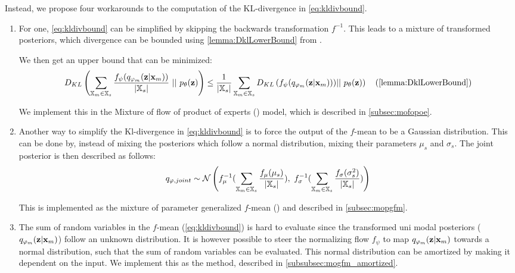 Instead, we propose four workarounds to the computation of the KL-divergence in \cref{eq:kldivbound}.
\begin{enumerate}

    \item For one, \cref{eq:kldivbound} can be simplified by skipping the backwards transformation $f^{-1}$.
    This leads to a mixture of transformed posteriors, which divergence can be bounded using \cref{lemma:DklLowerBound} from \parencite{sutter_multimodal_2020}.

    We then get an upper bound that can be minimized:
    \begin{equation}
        D_{KL}\left(\sum _{\xsetm \in \xsubset} \frac{f_{\psi}(\unimodalpost)}{|\xsubset|}\ ||\ \prior\right) \leq \frac{1}{|\xsubset|} \sum  _{\xsetm \in \xsubset} D_{KL} \left(f_{\psi} (\unimodalpost))||\ \prior \right) \quad (\cref{lemma:DklLowerBound})
    \end{equation}

    We implement this in the Mixture of flow of product of experts () model, which is described in \cref{subsec:mofopoe}.


    \item Another way to simplify the Kl-divergence in \cref{eq:kldivbound} is to force the output of the $f$-mean to be a Gaussian distribution.
    This can be done by, instead of mixing the posteriors which follow a normal distribution, mixing their parameters $\mu_s$ and $\sigma_s$.
    The joint posterior is then described as follows:
    \begin{equation}
        \label{eq:qjointmopgfm}
        q_{\phi, joint} \sim \mathcal{N}\left(  f_{\mu}^{-1}(\sum _{\xsetm \in \xsubset} \frac{f_{\mu}(\mu_s)}{|\xsubset|}),\ f_{\sigma}^{-1}(\sum  _{\xsetm \in \xsubset} \frac{f_{\sigma}(\sigma_s^2)}{|\xsubset|})\right)
    \end{equation}

    This is implemented as the mixture of parameter generalized $f$-mean () and described in \cref{subsec:mopgfm}.

    \item The sum of random variables in the $f$-mean (\cref{eq:kldivbound}) is hard to evaluate since the transformed uni modal posteriors ($q_{\varphi_m}(\textbf{z}|\textbf{x}_m)$) follow an unknown distribution.
    It is however possible to steer the normalizing flow $f_{\psi}$ to map $q_{\varphi_m}(\textbf{z}|\textbf{x}_m)$ towards a normal distribution, such that the sum of random variables can be evaluated.
    This normal distribution can be amortized by making it dependent on the input.
    We implement this as the  method, described in \cref{subsubsec:mogfm_amortized}.


\end{enumerate}
